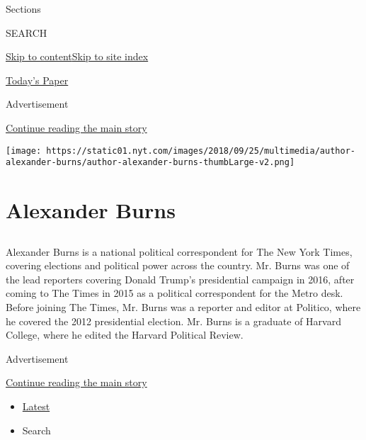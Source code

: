 Sections

SEARCH

\protect\hyperlink{site-content}{Skip to
content}\protect\hyperlink{site-index}{Skip to site index}

\href{https://myaccount.nytimes.com/auth/login?response_type=cookie\&client_id=vi}{}

\href{https://www.nytimes.com/section/todayspaper}{Today's Paper}

Advertisement

\protect\hyperlink{after-top}{Continue reading the main story}

\texttt{[image: https://static01.nyt.com/images/2018/09/25/multimedia/author-alexander-burns/author-alexander-burns-thumbLarge-v2.png]}

\hypertarget{alexander-burns}{%
\section{Alexander Burns}\label{alexander-burns}}

\subsection{}

Alexander Burns is a national political correspondent for The New York
Times, covering elections and political power across the country. Mr.
Burns was one of the lead reporters covering Donald Trump's presidential
campaign in 2016, after coming to The Times in 2015 as a political
correspondent for the Metro desk. Before joining The Times, Mr. Burns
was a reporter and editor at Politico, where he covered the 2012
presidential election. Mr. Burns is a graduate of Harvard College, where
he edited the Harvard Political Review.

Advertisement

\protect\hyperlink{after-mid1}{Continue reading the main story}

\begin{itemize}
\tightlist
\item
  \protect\hyperlink{stream-panel}{Latest}
\item
  Search
\end{itemize}

